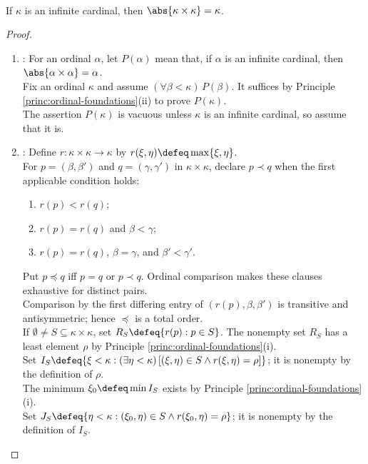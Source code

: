 \begin{theorem} \label{thm:infinite-cardinal-square-law} \\
If $\kappa$ is an infinite cardinal, then $\abs{\kappa\times\kappa}=\kappa$.
\begin{proof}
\begin{enumerate}[label=(\roman*)]
\setlength{\itemsep}{0pt}
\item {}: For an ordinal $\alpha$, let $P(\alpha)$ mean that, if $\alpha$ is an infinite cardinal, then $\abs{\alpha\times\alpha}=\alpha$.\\
Fix an ordinal $\kappa$ and assume $(\forall\beta<\kappa)\,P(\beta)$. It suffices by Principle \ref{princ:ordinal-foundations}(ii) to prove $P(\kappa)$.\\
The assertion $P(\kappa)$ is vacuous unless $\kappa$ is an infinite cardinal, so assume that it is.
\item {}: Define $r:\kappa\times\kappa\to\kappa$ by $r(\xi,\eta)\defeq\max\{\xi,\eta\}$.\\
For $p=(\beta,\beta')$ and $q=(\gamma,\gamma')$ in $\kappa\times\kappa$, declare $p\prec q$ when the first applicable condition holds:
\begin{enumerate}[label=(\alph*)]
\setlength{\itemsep}{0pt}
\item $r(p)<r(q)$;
\item $r(p)=r(q)$ and $\beta<\gamma$;
\item $r(p)=r(q)$, $\beta=\gamma$, and $\beta'<\gamma'$.
\end{enumerate}
Put $p\preceq q$ iff $p=q$ or $p\prec q$. Ordinal comparison makes these clauses exhaustive for distinct pairs.\\
Comparison by the first differing entry of $(r(p),\beta,\beta')$ is transitive and antisymmetric; hence $\preceq$ is a total order.\\
If $\emptyset\neq S\subseteq\kappa\times\kappa$, set $R_S\defeq\{r(p):p\in S\}$. The nonempty set $R_S$ has a least element $\rho$ by Principle \ref{princ:ordinal-foundations}(i).\\
Set $I_S\defeq\{\xi<\kappa:(\exists\eta<\kappa)\,[(\xi,\eta)\in S\land r(\xi,\eta)=\rho]\}$; it is nonempty by the definition of $\rho$.\\
The minimum $\xi_0\defeq\min I_S$ exists by Principle \ref{princ:ordinal-foundations}(i).\\
Set $J_S\defeq\{\eta<\kappa:(\xi_0,\eta)\in S\land r(\xi_0,\eta)=\rho\}$; it is nonempty by the definition of $I_S$.\\

\end{enumerate}
\end{proof}
\end{theorem}
